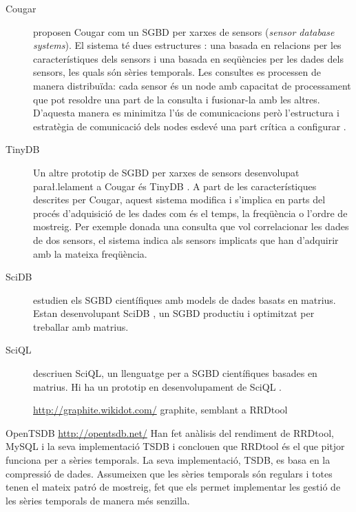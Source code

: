 \begin{description}
\item[Cougar]
\textcite{cougar,fung02} proposen Cougar com un SGBD per xarxes de sensors (\emph{sensor database systems}). El sistema té dues estructures \parencite{bonnet01}: una basada en relacions per les característiques dels sensors i una basada en seqüències per les dades dels sensors, les quals són sèries temporals.
Les consultes es processen de manera distribuïda: cada sensor és un node amb capacitat de processament que pot resoldre una part de la consulta i fusionar-la amb les altres. D'aquesta manera es minimitza l'ús de comunicacions però l'estructura i estratègia de comunicació dels nodes esdevé una part crítica a configurar \parencite{demers03}.

\item[TinyDB]
Un altre prototip de SGBD per xarxes de sensors desenvolupat para\l.lelament a Cougar és TinyDB \parencite{tinyDB,madden05}. A part de les característiques descrites per Cougar, aquest sistema  modifica i s'implica en parts del procés d'adquisició de les dades com és el temps, la freqüència o l'ordre de mostreig. Per exemple donada una consulta que vol correlacionar les dades de dos sensors, el sistema indica als sensors implicats que han d'adquirir amb la mateixa freqüència.

\item[SciDB]
\textcite{stonebraker09:scidb} estudien els SGBD científiques amb models  de dades basats en matrius. Estan desenvolupant SciDB \parencite{scidb}, un SGBD productiu i optimitzat per treballar amb matrius.


\item[SciQL]
\textcite{kersten11} descriuen SciQL, un llenguatge per a SGBD científiques basades en matrius. Hi ha un prototip en desenvolupament de SciQL \parencite{sciql}.


\url{http://graphite.wikidot.com/} graphite, semblant a RRDtool

\end{description}




\todo{}


OpenTSDB \cite{deri12:tsdb_compressed_database}
\url{http://opentsdb.net/}
Han fet anàlisis del rendiment de RRDtool, MySQL i la seva implementació TSDB i conclouen que RRDtool és el que pitjor funciona per a sèries temporals. La seva implementació, TSDB, es basa en la compressió de dades. Assumeixen que les sèries temporals són regulars i totes tenen el mateix patró de mostreig, fet que els permet implementar les gestió de les sèries temporals de manera més senzilla.




